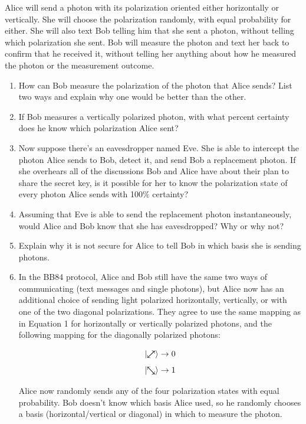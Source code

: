 \documentclass[12pt]{article}
\begin{document}
Alice will send a photon with its polarization oriented either horizontally or vertically. She will choose the polarization randomly, with equal probability for either. She will also text Bob telling him that she sent a photon, without telling which polarization she sent. Bob will measure the photon and text her back to confirm that he received it, without telling her anything about how he measured the photon or the measurement outcome.
\begin{enumerate}[label=\textbf{\alph*.}]
    \item How can Bob measure the polarization of the photon that Alice sends? List two ways and explain why one would be better than the other.
    \item If Bob measures a vertically polarized photon, with what percent certainty does he know which polarization Alice sent?
    \item Now suppose there's an eavesdropper named Eve. She is able to intercept the
photon Alice sends to Bob, detect it, and send Bob a replacement photon. If she
overhears all of the discussions Bob and Alice have about their plan to share the secret key, is it possible for her to know the polarization state of every photon Alice sends with 100$\%$ certainty?
    \item  Assuming that Eve is able to send the replacement photon instantaneously, would Alice and Bob know that she has eavesdropped? Why or why not?
    \item Explain why it is not secure for Alice to tell Bob in which basis she is sending
photons.
    \item In the BB84 protocol, Alice and Bob still have the same two ways of
communicating (text messages and single photons), but Alice now has an additional
choice of sending light polarized horizontally, vertically, or with one of the two diagonal
polarizations. They agree to use the same mapping as in Equation 1 for horizontally
or vertically polarized photons, and the following mapping for the diagonally polarized
photons:

\begin{equation}
    \ket{\Dzero} \rightarrow 0
\end{equation}
\begin{equation}
    \ket{\Done} \rightarrow 1
\end{equation}


Alice now randomly sends any of the four polarization states with equal probability.
Bob doesn't know which basis Alice used, so he randomly chooses a basis (horizontal/vertical or diagonal) in which to measure the photon.


\end{enumerate}
\end{document}

